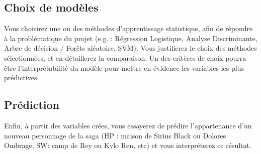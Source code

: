 \documentclass{article}
\begin{document}
\subsection*{Choix de modèles}

    Vous choisirez une ou des méthodes d'apprentissage statistique, afin de répondre à la problématique du projet (e.g. : Régression Logistique, Analyse Discriminante, Arbre de décision / Forêts aléatoire, SVM). Vous justifierez le choix des méthodes sélectionnées, et en détaillerez la comparaison. Un des critères de choix pourra être l'interprétabilité du modèle pour mettre en évidence les variables les plus prédictives.

\subsection*{Prédiction}

    Enfin, à partir des variables crées, vous essayerez de prédire l'appartenance d'un nouveau personnage de la saga  (HP : maison de Sirius Black ou Dolores Ombrage, SW: camp de Rey ou  Kylo Ren, etc) et vous interpréterez ce résultat.
\end{document}
